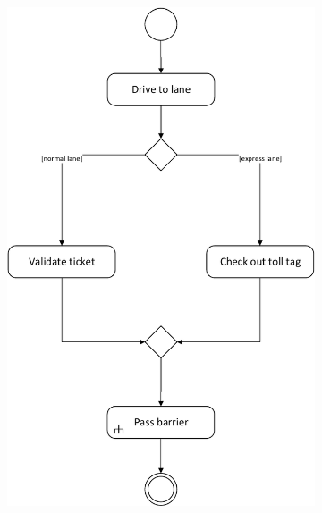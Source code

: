 

\begin{figure} 
	\centering
	\begin{subfigure}[b]{0.675\textwidth}
	\includegraphics[width=\textwidth]{img/activity_diagrams/Check_Out}

\end{subfigure}
\end{figure}

